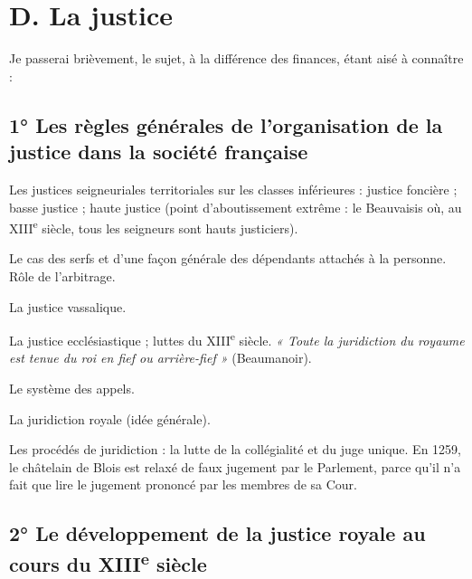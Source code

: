 \documentclass[french,twoside]{book} %
\begin{document}
\section[D. La justice]{D. La justice \protect\footnotemark}
\label{c04d}
\noindent Je passerai brièvement, le sujet, à la différence des finances, étant aisé à connaître :\par
\subsection[1° Les règles générales de l’organisation de la justice dans la société française]{1° Les règles générales de l’organisation de la justice dans la société française}

\begin{listalpha}[itemsep=0pt,]
\item Les justices seigneuriales territoriales sur les classes inférieures : justice foncière ; basse justice ; haute justice (point d’aboutissement extrême : le Beauvaisis où, au XIII\textsuperscript{e} siècle, tous les seigneurs sont hauts justiciers).
\item Le cas des serfs et d’une façon générale des dépendants attachés à la personne. Rôle de l’arbitrage.
\item La justice vassalique. 
\label{p43}
\item La justice ecclésiastique ; luttes du XIII\textsuperscript{e} siècle. \emph{« Toute la juridiction du royaume est tenue du roi en fief ou arrière-fief »} (Beaumanoir).
\item Le système des appels.
\item La juridiction royale (idée générale).
\item Les procédés de juridiction : la lutte de la collégialité et du juge unique. En 1259, le châtelain de Blois est relaxé de faux jugement par le Parlement, parce qu’il n’a fait que lire le jugement prononcé par les membres de sa Cour.

\end{listalpha}\subsection[2° Le développement de la justice royale au cours du XIIIe siècle]{2° Le développement de la justice royale au cours du XIII\textsuperscript{e} siècle}
\end{document}
